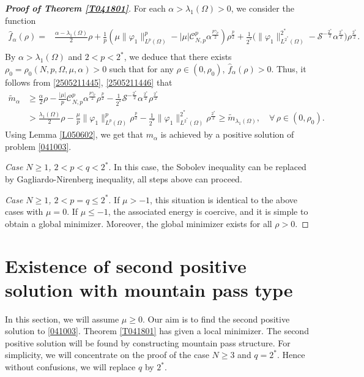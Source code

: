 \documentclass[10pt]{article}
\numberwithin{equation}{section}
\numberwithin{equation}{section}
\begin{document}
\begin{proof}[\bf Proof of Theorem \ref{T041801}]
For each $\alpha>\lambda_1(\Omega)>0$, we consider the function
\begin{equation*}
\begin{aligned}
\hat{f}_{\alpha}(\rho)
=&\frac{\alpha-\lambda_1(\Omega)}{2}\rho
+{\frac{1}{p}\left(\mu\|\varphi_1\|^p_{L^{p}(\Omega)}-|\mu|\mathcal{C}^{p}_{N,p}\alpha^{\frac{p\gamma_{p}}{2}}\right)\rho^{\frac{p}{2}}}
+\frac{1}{2^{*}}\big(\|\varphi_1\|^{2^{*}}_{L^{2^{*}}(\Omega)}
-\mathcal{S}^{-\frac{2^{*}}{2}}\alpha^{\frac{2^{*}}{2}}\big)\rho^{\frac{2^{*}}{2}}.\\
\end{aligned}
\end{equation*}
By $\alpha>\lambda_1(\Omega)$ and $2<p<2^*$, we deduce that there exists $\rho_0=\rho_0(N,p,\Omega, \mu, \alpha)>0$ such that  for any $\rho\in(0,\rho_0)$, $\hat{f}_{\alpha}(\rho)>0$.
Thus, it follows from \eqref{2505211445}, \eqref{2505211446} that
\begin{equation*}
\begin{aligned}
\widetilde{m}_{\alpha}
&\geq
\frac{\alpha}{2}\rho
-\frac{|\mu|}{p}\mathcal{C}^{p}_{N,p}\alpha^{\frac{p\gamma_{p}}{2}}\rho^{\frac{p}{2}}
-\frac{1}{2^{*}}\mathcal{S}^{-\frac{2^{*}}{2}}\alpha^{\frac{2^{*}}{2}}\rho^{\frac{2^{*}}{2}}\\
&>\frac{\lambda_1(\Omega)}{2}\rho
-\frac{\mu}{p}\|\varphi_1\|^p_{L^{p}(\Omega)}\rho^{\frac{p}{2}}
-\frac{1}{2^{*}}\|\varphi_1\|^{2^{*}}_{L^{2^{*}}(\Omega)}\rho^{\frac{2^{*}}{2}}
\geq\widetilde{m}_{\lambda_1(\Omega)},\quad \forall\,\rho\in(0,\rho_0).
\end{aligned}
\end{equation*}
Using Lemma \ref{L050602}, we get that $m_{\alpha}$ is achieved by a positive solution of problem \eqref{041003}.

\smallskip
{\it Case $N\ge 1$, $2<p<q<2^*$}. In this case,  the Sobolev inequality can be replaced by Gagliardo-Nirenberg inequality, all steps above can proceed.

\smallskip
{\it Case $N\ge 1$, $2<p=q\le 2^*$}. If $\mu>-1$,  this situation is identical to the above cases with $\mu=0$. If $\mu\le -1$, the associated energy is coercive, and it is simple to obtain a global minimizer. Moreover, the global minimizer exists for all $\rho>0$.
\end{proof}

\section{Existence of second positive solution with mountain pass type}\label{2506231135}
In this section, we will assume $\mu\ge 0$. Our aim is to find the second positive solution to \eqref{041003}. Theorem \ref{T041801} has given a local minimizer. The second positive solution will be found by constructing mountain pass structure. For simplicity, we will concentrate on the proof of the case $N\ge 3$ and $q=2^*$. Hence without confusions, we will replace $q$ by $2^*$.
\end{document}
